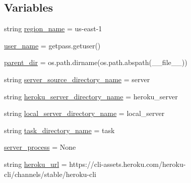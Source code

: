 \subsection*{Variables}
\begin{DoxyCompactItemize}
\item 
string \hyperlink{namespaceparlai_1_1chat__service_1_1services_1_1messenger_1_1server__utils_a4e22e27725adafcd1a6b95d189d627cf}{region\+\_\+name} = \textquotesingle{}us-\/east-\/1\textquotesingle{}
\item 
\hyperlink{namespaceparlai_1_1chat__service_1_1services_1_1messenger_1_1server__utils_a9b83dd4b20a92013cf4199f198aa360a}{user\+\_\+name} = getpass.\+getuser()
\item 
\hyperlink{namespaceparlai_1_1chat__service_1_1services_1_1messenger_1_1server__utils_acde853bd5872b1d77d8cbf7f61216c7a}{parent\+\_\+dir} = os.\+path.\+dirname(os.\+path.\+abspath(\+\_\+\+\_\+file\+\_\+\+\_\+))
\item 
string \hyperlink{namespaceparlai_1_1chat__service_1_1services_1_1messenger_1_1server__utils_aa10ee06f560e1007b8d3b50c869001c0}{server\+\_\+source\+\_\+directory\+\_\+name} = \textquotesingle{}server\textquotesingle{}
\item 
string \hyperlink{namespaceparlai_1_1chat__service_1_1services_1_1messenger_1_1server__utils_a9f647dadd18219a9e8bc19d810622582}{heroku\+\_\+server\+\_\+directory\+\_\+name} = \textquotesingle{}heroku\+\_\+server\textquotesingle{}
\item 
string \hyperlink{namespaceparlai_1_1chat__service_1_1services_1_1messenger_1_1server__utils_a3237a588c9ba62516404f9234816aaa5}{local\+\_\+server\+\_\+directory\+\_\+name} = \textquotesingle{}local\+\_\+server\textquotesingle{}
\item 
string \hyperlink{namespaceparlai_1_1chat__service_1_1services_1_1messenger_1_1server__utils_a087efe2fa17d505b0fa8753f6dbab06f}{task\+\_\+directory\+\_\+name} = \textquotesingle{}task\textquotesingle{}
\item 
\hyperlink{namespaceparlai_1_1chat__service_1_1services_1_1messenger_1_1server__utils_aa627704acdf6fa8e166558a521a14ef8}{server\+\_\+process} = None
\item 
string \hyperlink{namespaceparlai_1_1chat__service_1_1services_1_1messenger_1_1server__utils_a1673520e492a9e606a82b26fe83bdcb1}{heroku\+\_\+url} = \textquotesingle{}https\+://cli-\/assets.\+heroku.\+com/heroku-\/cli/channels/stable/heroku-\/cli\textquotesingle{}
\end{DoxyCompactItemize}



